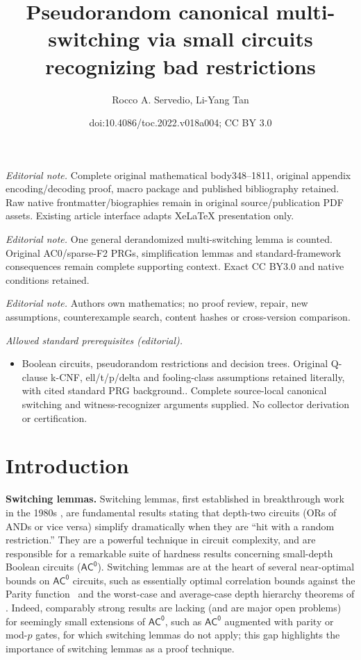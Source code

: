 \documentclass[11pt]{article}
\title{Pseudorandom canonical multi-switching via small circuits recognizing bad restrictions}
\author{Rocco A. Servedio, Li-Yang Tan}
\date{doi:10.4086/toc.2022.v018a004; CC BY 3.0}
\numberwithin{equation}{section}
\theoremstyle{definition}
\theoremstyle{plain}
\theoremstyle{plain}
\newcommand{\acz}{\mathsf{AC^0}}
\begin{document}
\maketitle
\noindent\textit{Editorial note.} Complete original mathematical body348--1811, original appendix encoding/decoding proof, macro package and published bibliography retained. Raw native frontmatter/biographies remain in original source/publication PDF assets. Existing article interface adapts XeLaTeX presentation only.\par\medskip
\noindent\textit{Editorial note.} One general derandomized multi-switching lemma is counted. Original AC0/sparse-F2 PRGs, simplification lemmas and standard-framework consequences remain complete supporting context. Exact CC BY3.0 and native conditions retained.\par\medskip
\noindent\textit{Editorial note.} Authors own mathematics; no proof review, repair, new assumptions, counterexample search, content hashes or cross-version comparison.\par\medskip
\noindent\textit{Allowed standard prerequisites (editorial).}\begin{itemize}
\item Boolean circuits, pseudorandom restrictions and decision trees. Original Q-clause k-CNF, ell/t/p/delta and fooling-class assumptions retained literally, with cited standard PRG background.. Complete source-local canonical switching and witness-recognizer arguments supplied. No collector derivation or certification.
\end{itemize}\medskip
\section{Introduction} 

{\bf Switching lemmas.}  Switching lemmas, first established in
%
breakthrough work %
%
in the 1980s \cite{ajtai1983,FSS:84,yao1985,Hastad86}, are fundamental results stating that depth-two circuits (ORs of ANDs or vice versa) simplify dramatically when they are ``hit with a random restriction.''  They are a powerful technique in circuit complexity, and are responsible for a remarkable suite of hardness results concerning small-depth Boolean circuits ($\acz$). Switching lemmas are at the heart of several near-optimal bounds on $\acz$ circuits, such as essentially optimal correlation bounds against the {\sc Parity} function~\cite{IMP12,Has14} and the worst-case and average-case depth hierarchy theorems of \cite{Hastad86,RST15,Hastad16}.  Indeed, comparably strong results are lacking (and are major open problems) for seemingly small extensions of $\acz$, such as $\acz$ augmented with parity or mod-$p$ gates, for which switching lemmas do not apply; this gap highlights the importance of switching lemmas as a proof technique.
\end{document}
